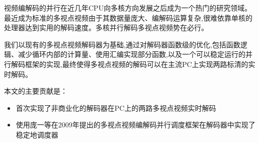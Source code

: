 

\makeatletter
\ifthu@bachelor\relax\else
  \ifthu@doctor
  \else
    \ifthu@master
    \fi
  \fi
\fi
\makeatother



\begin{cabstract}

视频编解码的并行在近几年CPU向多核方向发展之后成为一个热门的研究领域。最近成为标准的多视点视频由于其数据量庞大、编解码运算复杂,很难依靠单核的处理器达到实用的解码速度。多核并行解码多视点视频势在必行。

我们以现有的多视点视频解码器为基础,通过对解码器函数级的优化,包括函数逻辑、减少循环内部的计算量、使用汇编实现部分函数,以及一个可以稳定运行的并行解码框架的实现,最终使得多视点视频的解码可以在主流PC上实现两路标清的实时解码。

本文的主要贡献是：
\begin{itemize}
\item 首次实现了非商业化的解码器在PC上的两路多视点视频实时解码
\item 使用庞一等在2009年提出的多视点视频编解码并行调度框架\cite{pang2009framework}在解码器中实现了稳定地调度器
\end{itemize}

\end{cabstract}


